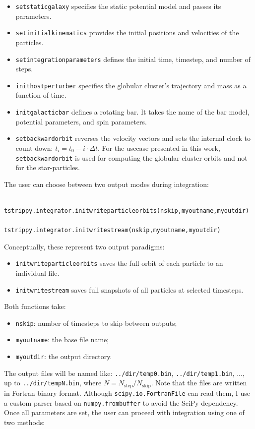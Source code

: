         \begin{itemize}
            \item \texttt{setstaticgalaxy} specifies the static potential model and passes its parameters.
            \item \texttt{setinitialkinematics} provides the initial positions and velocities of the particles.
            \item \texttt{setintegrationparameters} defines the initial time, timestep, and number of steps.
            \item \texttt{inithostperturber} specifies the globular cluster's trajectory and mass as a function of time.
            \item \texttt{initgalacticbar} defines a rotating bar. It takes the name of the bar model, potential parameters, and spin parameters.
            \item \texttt{setbackwardorbit} reverses the velocity vectors and sets the internal clock to count down: $t_i = t_0 - i \cdot \Delta t$. For the usecase presented in this work, \texttt{setbackwardorbit} is used for computing the globular cluster orbits and not for the star-particles. 
        \end{itemize}
        The user can choose between two output modes during integration:
        \begin{lstlisting}
            tstrippy.integrator.initwriteparticleorbits(nskip,myoutname,myoutdir)
            tstrippy.integrator.initwritestream(nskip,myoutname,myoutdir)
        \end{lstlisting}
        Conceptually, these represent two output paradigms:
        \begin{itemize}
            \item \texttt{initwriteparticleorbits} saves the full orbit of each particle to an individual file.
            \item \texttt{initwritestream} saves full snapshots of all particles at selected timesteps.
        \end{itemize}
        Both functions take:
        \begin{itemize}
            \item \texttt{nskip}: number of timesteps to skip between outputs;
            \item\texttt{myoutname}: the base file name;
            \item \texttt{myoutdir}: the output directory.
        \end{itemize}
        The output files will be named like: \texttt{../dir/temp0.bin}, \texttt{../dir/temp1.bin}, ..., up to \texttt{../dir/tempN.bin}, where $N = N_\mathrm{step} / N_\mathrm{skip}$. Note that the files are written in Fortran binary format. Although \texttt{scipy.io.FortranFile} can read them, I use a custom parser based on \texttt{numpy.frombuffer} to avoid the SciPy dependency. Once all parameters are set, the user can proceed with integration using one of two methods:

